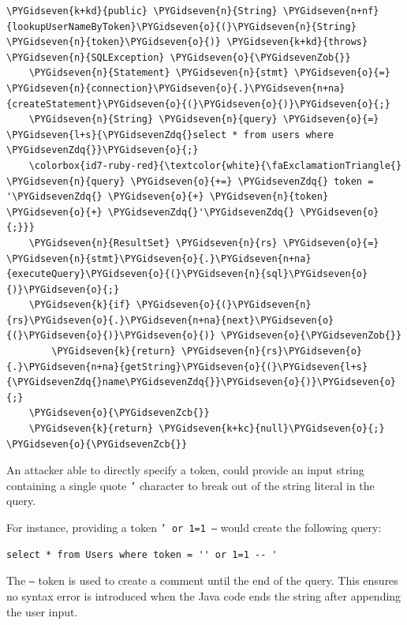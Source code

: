 \documentclass[a4paper,openany,12pt]{book}
\newcommand{\infobox}[1] {\colorbox{infogreenlight}{\parbox{\textwidth}{\vspace{.75\baselineskip}\centering\parbox{0.95\textwidth}{\faIcon{info-circle} #1\vspace{.75\baselineskip}}}}}
\begin{document}
\begin{mdframed}[backgroundcolor=lightgrey]
\begin{Verbatim}[commandchars=\\\{\}]
\PYGidseven{k+kd}{public} \PYGidseven{n}{String} \PYGidseven{n+nf}{lookupUserNameByToken}\PYGidseven{o}{(}\PYGidseven{n}{String} \PYGidseven{n}{token}\PYGidseven{o}{)} \PYGidseven{k+kd}{throws} \PYGidseven{n}{SQLException} \PYGidseven{o}{\PYGidsevenZob{}}
    \PYGidseven{n}{Statement} \PYGidseven{n}{stmt} \PYGidseven{o}{=} \PYGidseven{n}{connection}\PYGidseven{o}{.}\PYGidseven{n+na}{createStatement}\PYGidseven{o}{(}\PYGidseven{o}{)}\PYGidseven{o}{;}
    \PYGidseven{n}{String} \PYGidseven{n}{query} \PYGidseven{o}{=} \PYGidseven{l+s}{\PYGidsevenZdq{}select * from users where \PYGidsevenZdq{}}\PYGidseven{o}{;}
    \colorbox{id7-ruby-red}{\textcolor{white}{\faExclamationTriangle{} \PYGidseven{n}{query} \PYGidseven{o}{+=} \PYGidsevenZdq{} token = '\PYGidsevenZdq{} \PYGidseven{o}{+} \PYGidseven{n}{token} \PYGidseven{o}{+} \PYGidsevenZdq{}'\PYGidsevenZdq{} \PYGidseven{o}{;}}}
    \PYGidseven{n}{ResultSet} \PYGidseven{n}{rs} \PYGidseven{o}{=} \PYGidseven{n}{stmt}\PYGidseven{o}{.}\PYGidseven{n+na}{executeQuery}\PYGidseven{o}{(}\PYGidseven{n}{sql}\PYGidseven{o}{)}\PYGidseven{o}{;}
    \PYGidseven{k}{if} \PYGidseven{o}{(}\PYGidseven{n}{rs}\PYGidseven{o}{.}\PYGidseven{n+na}{next}\PYGidseven{o}{(}\PYGidseven{o}{)}\PYGidseven{o}{)} \PYGidseven{o}{\PYGidsevenZob{}}
        \PYGidseven{k}{return} \PYGidseven{n}{rs}\PYGidseven{o}{.}\PYGidseven{n+na}{getString}\PYGidseven{o}{(}\PYGidseven{l+s}{\PYGidsevenZdq{}name\PYGidsevenZdq{}}\PYGidseven{o}{)}\PYGidseven{o}{;}
    \PYGidseven{o}{\PYGidsevenZcb{}}
    \PYGidseven{k}{return} \PYGidseven{k+kc}{null}\PYGidseven{o}{;}
\PYGidseven{o}{\PYGidsevenZcb{}}
\end{Verbatim}
\end{mdframed}

An attacker able to directly specify a token, could provide an input string containing a single quote \texttt{'}
character to break out of the string literal in the query.

For instance, providing a token \texttt{' or 1=1 --} would create the following query:

\begin{verbatim}
select * from Users where token = '' or 1=1 -- '
\end{verbatim}

\infobox{
The \texttt{--} token is used to create a comment until the end of the query.
This ensures no syntax error is introduced when the Java code ends the string after appending the user input.}
\end{document}
